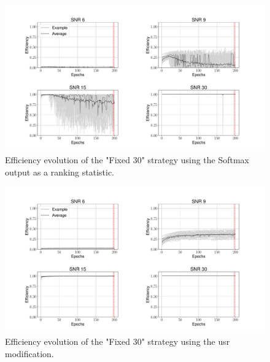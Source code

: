 \begin{figure}
    \centering
    \includegraphics[width=\textwidth]{chapters/training_strats/images/fixed_30_soft.pdf}
    \caption[Efficiency evolution ``Fixed 30'' using Softmax]{Efficiency evolution of the "Fixed 30" strategy using the Softmax output as a ranking statistic.}
    \label{fig:efficiency_evolution_fixed_30_soft}
\end{figure}

\begin{figure}
    \centering
    \includegraphics[width=\textwidth]{chapters/training_strats/images/fixed_30_lin.pdf}
    \caption[Efficiency evolution ``Fixed 30'' using unbounded Softmax replacement]{Efficiency evolution of the "Fixed 30" strategy using the \acrshort{usr} modification.}
    \label{fig:efficiency_evolution_fixed_30_lin}
\end{figure}
